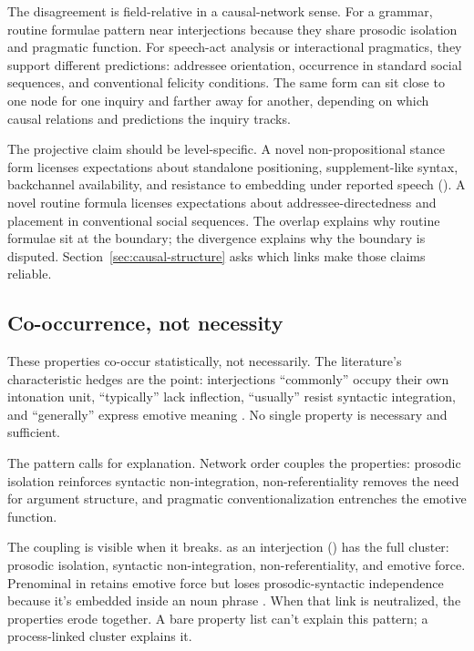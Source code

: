 \documentclass[12pt]{article}
\begin{document}
The disagreement is field-relative in a causal-network sense. For a
grammar, routine formulae pattern near interjections because they share
prosodic isolation and pragmatic function. For speech-act analysis or
interactional pragmatics, they support different predictions: addressee
orientation, occurrence in standard social sequences, and conventional
felicity conditions. The same form can sit close to one node
for one inquiry and farther away for another, depending on which causal
relations and predictions the inquiry tracks.

The projective claim should be level-specific. A novel
non-propositional stance form licenses expectations about standalone
positioning, supplement-like syntax, backchannel availability, and
resistance to embedding under reported speech (). A novel routine formula licenses expectations about
addressee-directedness and placement in conventional social sequences.
The overlap explains why routine formulae sit at the boundary; the
divergence explains why the boundary is disputed.
Section~\ref{sec:causal-structure} asks which links make those claims
reliable.

\subsection{Co-occurrence, not necessity}\label{sec:cooccurrence}

These properties co-occur statistically, not necessarily. The
literature's characteristic hedges are the point:
interjections \enquote{commonly} occupy their own intonation unit,
\enquote{typically} lack inflection, \enquote{usually} resist
syntactic integration, and \enquote{generally} express emotive meaning
\citep[cf.][]{ameka1992, wilkins1992}. No single property is necessary
and sufficient.

The pattern calls for explanation. Network order couples the
properties: prosodic isolation reinforces syntactic non-integration,
non-referentiality removes the need for argument structure, and
pragmatic conventionalization entrenches the emotive function.

The coupling is visible when it breaks.  as an interjection
() has the full cluster: prosodic isolation, syntactic
non-integration, non-referentiality, and emotive force. Prenominal
 in  retains emotive force but
loses prosodic-syntactic independence because it's embedded inside an
noun phrase \citep[cf.][]{potts2007}. When that link is neutralized, the
properties erode together. A bare property list can't explain this
pattern; a process-linked cluster explains it.
\end{document}
